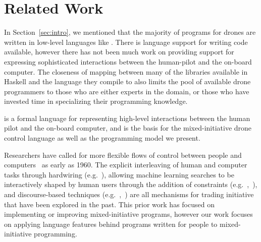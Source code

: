 \documentclass{sig-alternate-05-2015}
\begin{document}
\section{Related Work}
\label{sec:related}

%
In Section~\ref{sec:intro}, we mentioned that the majority of programs for
drones are written in low-level languages like . There is language
support for writing  code available, however there has not been
much work on providing support for expressing sophisticated interactions
between the human-pilot and the on-board computer. The closeness of mapping
between many of the libraries available in Haskell and the  language
they compile to also limits the pool of available drone programmers to those
who are either experts in the domain, or those who have invested time in
specializing their programming knowledge.

 is a formal language for
representing high-level interactions between the human pilot and the on-board
computer, and is the basis for the mixed-initiative drone control language as
well as the programming model we present.

Researchers have called for more flexible flows of control between people and
computers~\cite{L60symbiosis} as early as 1960. The explicit interleaving
of human and computer tasks through hardwiring (e.g.~\cite{LHML08cosripter}), allowing
machine learning searches to be interactively shaped by human users through
the addition of constraints (e.g.~\cite{LMRS04symbiosis},~\cite{Kea11why}), and
discourse-based techniques (e.g.~\cite{SRL01collagen},~\cite{ML92explanatory}) are all
mechanisms for trading initiative that have been explored in the past. This
prior work has focused on implementing or improving mixed-initiative programs,
however our work focuses on applying language features behind programs written
for people to mixed-initiative programming.
\end{document}
